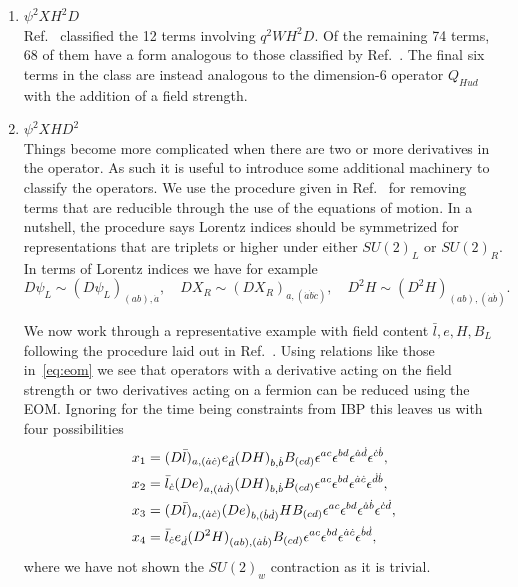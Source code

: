 \begin{enumerate}
\item $\psi^2XH^2D$ \\
Ref.~\cite{Hays:2018zze} classified the 12 terms involving $q^2WH^2D$.
Of the remaining 74 terms, 68 of them have a form analogous to those classified by Ref.~\cite{Hays:2018zze}.
The final six terms in the class are instead analogous to the dimension-6 operator $Q_{Hud}$ with the addition of a field strength.

\item $\psi^2XHD^2$ \\
Things become more complicated when there are two or more derivatives in the operator.
As such it is useful to introduce some additional machinery to classify the operators.
We use the procedure given in Ref.~\cite{Lehman:2015via} for removing terms that are reducible through the use of the equations of motion.
In a nutshell, the procedure says Lorentz indices should be symmetrized for representations that are triplets or higher under either $SU(2)_L$ or $SU(2)_R$.
In terms of Lorentz indices we have for example
\begin{equation}
\label{eq:eom}
D \psi_L \sim (D \psi_L)_{(a b), \dot a}, \quad D X_R \sim (D X_R)_{a, (\dot a \dot b \dot c)}, \quad D^2 H \sim (D^2 H)_{(a b), (\dot a \dot b)} .
\end{equation} 

We now work through a representative example with field content $\bar l, e, H, B_L$ following the procedure laid out in Ref.~\cite{Hays:2018zze}.
Using relations like those in~\eqref{eq:eom} we see that operators with a derivative acting on the field strength or two derivatives acting on a fermion can be reduced using the EOM. Ignoring for the time being constraints from IBP this leaves us with four possibilities
\begin{align}
\label{eq:cand}
x_1 &= (D \bar l)_{a, (\dot a \dot c)} e_{\dot d} (D H)_{b, \dot b} B_{(c d)} \epsilon^{a c} \epsilon^{b d} \epsilon^{\dot a \dot d} \epsilon^{\dot c \dot b}, \nonumber\\ 
x_2 &= \bar l_{\dot c} (D e)_{a, (\dot a \dot d)} (D H)_{b, \dot b} B_{(c d)} \epsilon^{a c} \epsilon^{b d} \epsilon^{\dot a \dot c} \epsilon^{\dot d \dot b}, \nonumber\\ 
x_3 &= (D \bar l)_{a, (\dot a \dot c)} (D e)_{b, (\dot b \dot d)} H B_{(c d)} \epsilon^{a c} \epsilon^{b d} \epsilon^{\dot a \dot b} \epsilon^{\dot c \dot d}, \nonumber\\ 
x_4 &= \bar l_{\dot c} e_{\dot d} (D^2 H)_{(a b), (\dot a \dot b)} B_{(c d)} \epsilon^{a c} \epsilon^{b d} \epsilon^{\dot a \dot c} \epsilon^{\dot b \dot d},
\end{align} 
where we have not shown the $SU(2)_w$ contraction as it is trivial.


\end{enumerate}
